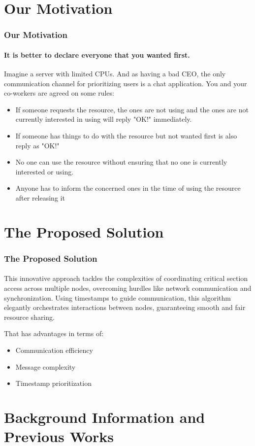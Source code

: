 \documentclass[11pt]{beamer}              %
\begin{document}
\section{Our Motivation}
\begin{frame}
\frametitle{Our Motivation}
\framesubtitle{It is better to declare everyone that you wanted first.}
Imagine a server with limited CPUs. And as having a bad CEO, the only communication channel for prioritizing users is a chat application. You and your co-workers are agreed on some rules:
\begin{itemize}
    \item If someone requests the resource, the ones are not using and the ones are not currently interested in using will reply "OK!" immediately.
    \item If someone has things to do with the resource but not wanted first is also reply as "OK!"
    \item No one can use the resource without ensuring that no one is currently interested or using.
    \item Anyone has to inform the concerned ones in the time of using the resource after releasing it
\end{itemize}
\end{frame}
\note{}

\section{The Proposed Solution}
\begin{frame}
\frametitle{The Proposed Solution}
\framesubtitle{}

This innovative approach tackles the complexities of coordinating critical section access across multiple nodes, overcoming hurdles like network communication and synchronization. Using timestamps to guide communication, this algorithm elegantly orchestrates interactions between nodes, guaranteeing smooth and fair resource sharing.

That has advantages in terms of:

\begin{itemize}
\item Communication efficiency
\item Message complexity
\item Timestamp prioritization
\end{itemize}

\end{frame}


\section{Background Information and Previous Works}
\end{document}
